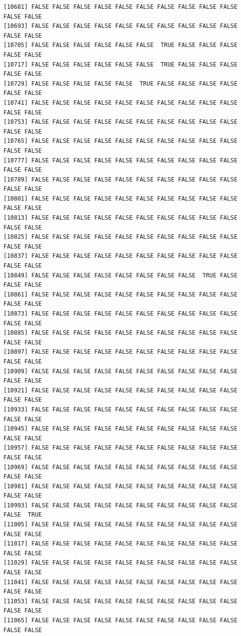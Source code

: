 \documentclass[
  a4paper,
  DIV=11,
  numbers=noendperiod]{scrartcl}
\begin{document}
\begin{verbatim}
[10681] FALSE FALSE FALSE FALSE FALSE FALSE FALSE FALSE FALSE FALSE FALSE FALSE
[10693] FALSE FALSE FALSE FALSE FALSE FALSE FALSE FALSE FALSE FALSE FALSE FALSE
[10705] FALSE FALSE FALSE FALSE FALSE FALSE  TRUE FALSE FALSE FALSE FALSE FALSE
[10717] FALSE FALSE FALSE FALSE FALSE FALSE  TRUE FALSE FALSE FALSE FALSE FALSE
[10729] FALSE FALSE FALSE FALSE FALSE  TRUE FALSE FALSE FALSE FALSE FALSE FALSE
[10741] FALSE FALSE FALSE FALSE FALSE FALSE FALSE FALSE FALSE FALSE FALSE FALSE
[10753] FALSE FALSE FALSE FALSE FALSE FALSE FALSE FALSE FALSE FALSE FALSE FALSE
[10765] FALSE FALSE FALSE FALSE FALSE FALSE FALSE FALSE FALSE FALSE FALSE FALSE
[10777] FALSE FALSE FALSE FALSE FALSE FALSE FALSE FALSE FALSE FALSE FALSE FALSE
[10789] FALSE FALSE FALSE FALSE FALSE FALSE FALSE FALSE FALSE FALSE FALSE FALSE
[10801] FALSE FALSE FALSE FALSE FALSE FALSE FALSE FALSE FALSE FALSE FALSE FALSE
[10813] FALSE FALSE FALSE FALSE FALSE FALSE FALSE FALSE FALSE FALSE FALSE FALSE
[10825] FALSE FALSE FALSE FALSE FALSE FALSE FALSE FALSE FALSE FALSE FALSE FALSE
[10837] FALSE FALSE FALSE FALSE FALSE FALSE FALSE FALSE FALSE FALSE FALSE FALSE
[10849] FALSE FALSE FALSE FALSE FALSE FALSE FALSE FALSE  TRUE FALSE FALSE FALSE
[10861] FALSE FALSE FALSE FALSE FALSE FALSE FALSE FALSE FALSE FALSE FALSE FALSE
[10873] FALSE FALSE FALSE FALSE FALSE FALSE FALSE FALSE FALSE FALSE FALSE FALSE
[10885] FALSE FALSE FALSE FALSE FALSE FALSE FALSE FALSE FALSE FALSE FALSE FALSE
[10897] FALSE FALSE FALSE FALSE FALSE FALSE FALSE FALSE FALSE FALSE FALSE FALSE
[10909] FALSE FALSE FALSE FALSE FALSE FALSE FALSE FALSE FALSE FALSE FALSE FALSE
[10921] FALSE FALSE FALSE FALSE FALSE FALSE FALSE FALSE FALSE FALSE FALSE FALSE
[10933] FALSE FALSE FALSE FALSE FALSE FALSE FALSE FALSE FALSE FALSE FALSE FALSE
[10945] FALSE FALSE FALSE FALSE FALSE FALSE FALSE FALSE FALSE FALSE FALSE FALSE
[10957] FALSE FALSE FALSE FALSE FALSE FALSE FALSE FALSE FALSE FALSE FALSE FALSE
[10969] FALSE FALSE FALSE FALSE FALSE FALSE FALSE FALSE FALSE FALSE FALSE FALSE
[10981] FALSE FALSE FALSE FALSE FALSE FALSE FALSE FALSE FALSE FALSE FALSE FALSE
[10993] FALSE FALSE FALSE FALSE FALSE FALSE FALSE FALSE FALSE FALSE FALSE  TRUE
[11005] FALSE FALSE FALSE FALSE FALSE FALSE FALSE FALSE FALSE FALSE FALSE FALSE
[11017] FALSE FALSE FALSE FALSE FALSE FALSE FALSE FALSE FALSE FALSE FALSE FALSE
[11029] FALSE FALSE FALSE FALSE FALSE FALSE FALSE FALSE FALSE FALSE FALSE FALSE
[11041] FALSE FALSE FALSE FALSE FALSE FALSE FALSE FALSE FALSE FALSE FALSE FALSE
[11053] FALSE FALSE FALSE FALSE FALSE FALSE FALSE FALSE FALSE FALSE FALSE FALSE
[11065] FALSE FALSE FALSE FALSE FALSE FALSE FALSE FALSE FALSE FALSE FALSE FALSE

\end{verbatim}
\end{document}
